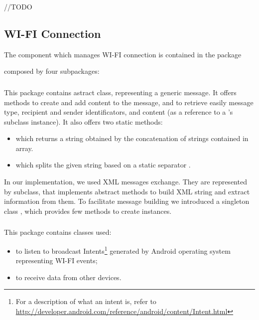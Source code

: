 //TODO

\subsection{WI-FI Connection}
The component which manages WI-FI connection is contained in the package \begin{center}\end{center} composed by four subpackages:
	\\
	\subsubsection{}
	This package contains  astract class, representing a generic message. It offers methods to create and add content to the message, and to retrieve easily message type, recipient and sender identificators, and content (as a reference to a 's subclass instance). It also offers two static methods:
	\begin{itemize}
		\item {} which returns a string obtained by the concatenation of strings contained in  array.
		\item {} which splits the given string based on a static separator . 
	\end{itemize}
	In our implementation, we used XML messages exchange. They are represented by  subclass, that implements  abstract methods to build XML string and extract information from them. To facilitate message building we introduced a singleton class , which provides few methods to create  instances.
	\hfill\\
	\subsubsection{}
	This package contains classes used:
	\begin{itemize}
		\item to listen to broadcast Intents\footnote{For a description of what an intent is, refer to \url{http://developer.android.com/reference/android/content/Intent.html}} generated by Android operating system representing WI-FI events;
		\item to receive data from other devices.
	\end{itemize}
	
